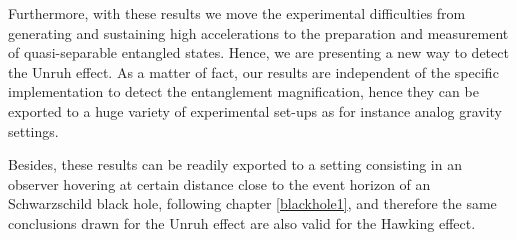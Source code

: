 Furthermore, with these results we move the experimental difficulties from generating and sustaining high accelerations to the preparation and measurement of quasi-separable entangled states. Hence, we are presenting a new way to detect the Unruh effect. As a matter of fact, our results are independent of the specific implementation to detect the entanglement magnification,  hence they can be exported to a huge variety of experimental set-ups as for instance analog gravity settings.


Besides, these results can be readily exported to a setting consisting in an observer hovering at certain distance close to the event horizon of an Schwarzschild black hole, following chapter \ref{blackhole1}, and therefore the same conclusions drawn for the Unruh effect are also valid for the Hawking effect.




